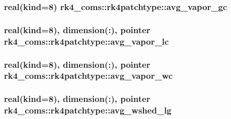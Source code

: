 \subsubsection[{avg\+\_\+vapor\+\_\+gc}]{\setlength{\rightskip}{0pt plus 5cm}real(kind=8) rk4\+\_\+coms\+::rk4patchtype\+::avg\+\_\+vapor\+\_\+gc}\label{structrk4__coms_1_1rk4patchtype_af1544e566b39e6b6e206fc22e90a8b29}
\hypertarget{structrk4__coms_1_1rk4patchtype_acea041337343e625db3c1d6fce434694}{}
\subsubsection[{avg\+\_\+vapor\+\_\+lc}]{\setlength{\rightskip}{0pt plus 5cm}real(kind=8), dimension(\+:), pointer rk4\+\_\+coms\+::rk4patchtype\+::avg\+\_\+vapor\+\_\+lc}\label{structrk4__coms_1_1rk4patchtype_acea041337343e625db3c1d6fce434694}
\hypertarget{structrk4__coms_1_1rk4patchtype_a55a8b0a5fd4019d12159c9e48025db0b}{}
\subsubsection[{avg\+\_\+vapor\+\_\+wc}]{\setlength{\rightskip}{0pt plus 5cm}real(kind=8), dimension(\+:), pointer rk4\+\_\+coms\+::rk4patchtype\+::avg\+\_\+vapor\+\_\+wc}\label{structrk4__coms_1_1rk4patchtype_a55a8b0a5fd4019d12159c9e48025db0b}
\hypertarget{structrk4__coms_1_1rk4patchtype_a018e4fa2fc1e1fc551ab51a4e0521839}{}
\subsubsection[{avg\+\_\+wshed\+\_\+lg}]{\setlength{\rightskip}{0pt plus 5cm}real(kind=8), dimension(\+:), pointer rk4\+\_\+coms\+::rk4patchtype\+::avg\+\_\+wshed\+\_\+lg}\label{structrk4__coms_1_1rk4patchtype_a018e4fa2fc1e1fc551ab51a4e0521839}
\hypertarget{structrk4__coms_1_1rk4patchtype_af555a7dbf808cae7ef86169e8b66f33c}{}
